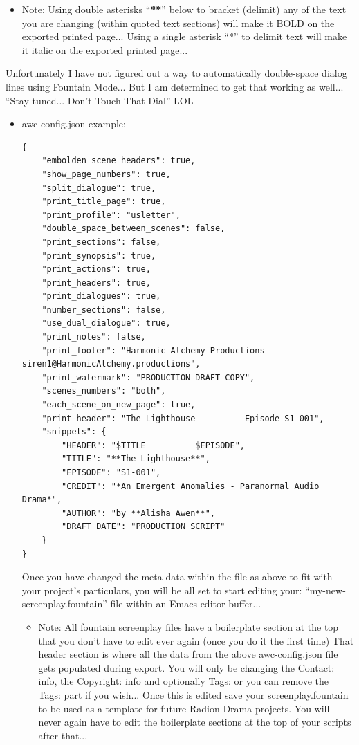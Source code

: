 \documentclass[openleft,oneside,showtrims]{memoir}
\begin{document}
\begin{itemize}
\item Note: Using double asterisks ``\textbf{**}'' below to bracket (delimit) any of the text you are changing (within quoted text sections) will make it BOLD on the exported printed page...  Using a single asterisk ``*'' to delimit text will make it italic on the exported printed page...
\end{itemize}

Unfortunately I have not figured out a way to automatically double-space dialog lines using Fountain Mode... But I am determined to get that working as well... ``Stay tuned... Don't Touch That Dial'' LOL

\begin{itemize}
\item awc-config.json example:
\label{sec:orgab45226}

\lstset{language=js,label= ,caption= ,captionpos=b,numbers=none}
\begin{lstlisting}
{
    "embolden_scene_headers": true,
    "show_page_numbers": true,
    "split_dialogue": true,
    "print_title_page": true,
    "print_profile": "usletter",
    "double_space_between_scenes": false,
    "print_sections": false,
    "print_synopsis": true,
    "print_actions": true,
    "print_headers": true,
    "print_dialogues": true,
    "number_sections": false,
    "use_dual_dialogue": true,
    "print_notes": false,
    "print_footer": "Harmonic Alchemy Productions - siren1@HarmonicAlchemy.productions",
    "print_watermark": "PRODUCTION DRAFT COPY",
    "scenes_numbers": "both",
    "each_scene_on_new_page": true,
    "print_header": "The Lighthouse          Episode S1-001",
    "snippets": {
        "HEADER": "$TITLE          $EPISODE",
        "TITLE": "**The Lighthouse**",
        "EPISODE": "S1-001",
        "CREDIT": "*An Emergent Anomalies - Paranormal Audio Drama*",
        "AUTHOR": "by **Alisha Awen**",
        "DRAFT_DATE": "PRODUCTION SCRIPT"
    }
}
\end{lstlisting}

Once you have changed the meta data within the file as above to fit with your project's particulars, you will be all set to start editing your: ``my-new-screenplay.fountain'' file within an Emacs editor buffer...

\begin{itemize}
\item Note: All fountain screenplay files have a boilerplate section at the top that you don't have to edit ever again (once you do it the first time) That header section is where all the data from the above awc-config.json file gets populated during export.  You will only be changing the Contact: info, the Copyright: info and optionally Tags: or you can remove the Tags: part if you wish...  Once this is edited save your screenplay.fountain to be used as a template for future Radion Drama projects.  You will never again have to edit the boilerplate sections at the top of your scripts after that...
\end{itemize}


\end{itemize}
\end{document}
